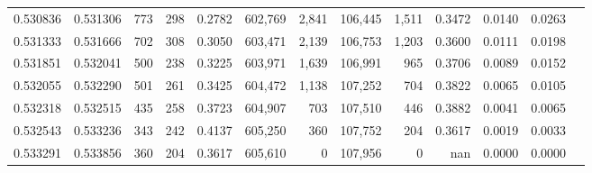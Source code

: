 \begin{tabular}{rrrrrrrrrrrrr}
0.530836 & 0.531306 &    773 &   298 &                                     0.2782 & 602,769 &   2,841 & 106,445 &   1,511 & 0.3472 & 0.0140 & 0.0263 \\
0.531333 & 0.531666 &    702 &   308 &                                     0.3050 & 603,471 &   2,139 & 106,753 &   1,203 & 0.3600 & 0.0111 & 0.0198 \\
0.531851 & 0.532041 &    500 &   238 &                                     0.3225 & 603,971 &   1,639 & 106,991 &     965 & 0.3706 & 0.0089 & 0.0152 \\
0.532055 & 0.532290 &    501 &   261 &                                     0.3425 & 604,472 &   1,138 & 107,252 &     704 & 0.3822 & 0.0065 & 0.0105 \\
0.532318 & 0.532515 &    435 &   258 &                                     0.3723 & 604,907 &     703 & 107,510 &     446 & 0.3882 & 0.0041 & 0.0065 \\
0.532543 & 0.533236 &    343 &   242 &                                     0.4137 & 605,250 &     360 & 107,752 &     204 & 0.3617 & 0.0019 & 0.0033 \\
0.533291 & 0.533856 &    360 &   204 &                                     0.3617 & 605,610 &       0 & 107,956 &       0 &    nan & 0.0000 & 0.0000 \\
\bottomrule
\end{tabular}
